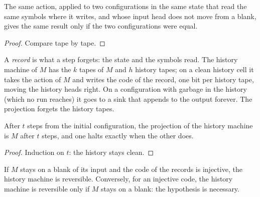 \begin{lemma}
  \label{lem:apply-injective}
  \leanok
  The same action, applied to two configurations in the same state that read the same symbols where
  it writes, and whose input head does not move from a blank, gives the same result only if the two
  configurations were equal.
\end{lemma}

\begin{proof}
  \leanok
  Compare tape by tape.
\end{proof}

\begin{definition}
  \label{def:histTM}
  \leanok
  A \emph{record} is what a step forgets: the state and the symbols read. The history machine of
  $M$ has the $k$ tapes of $M$ and $h$ history tapes; on a clean history cell it takes the action of
  $M$ and writes the code of the record, one bit per history tape, moving the history heads right.
  On a configuration with garbage in the history (which no run reaches) it goes to a sink that
  appends to the output forever. The projection forgets the history tapes.
\end{definition}

\begin{theorem}
  \label{thm:histTM-simulates}
  \leanok
  After $t$ steps from the initial configuration, the projection of the history machine is $M$
  after $t$ steps, and one halts exactly when the other does.
\end{theorem}

\begin{proof}
  \leanok
  Induction on $t$: the history stays clean.
\end{proof}

\begin{theorem}
  \label{thm:histTM-reversible}
  \leanok
  If $M$ stays on a blank of its input and the code of the records is injective, the history
  machine is reversible. Conversely, for an injective code, the history machine is reversible only
  if $M$ stays on a blank: the hypothesis is necessary.
\end{theorem}

